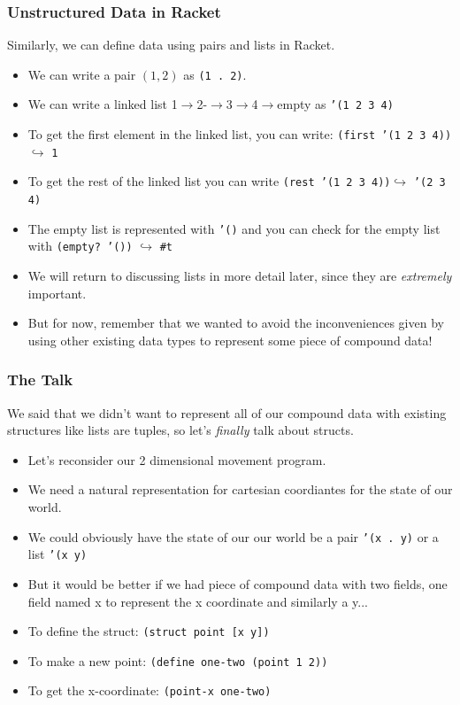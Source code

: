 \documentclass{beamer}
\begin{document}
\begin{frame}
  \frametitle{Unstructured Data in Racket}
  Similarly, we can define data using pairs and lists in Racket.
  \begin{itemize}
  \item<2-> We can write a pair $(1, 2)$ as \texttt{(1 . 2)}.
  \item<3-> We can write a linked list 1$\rightarrow$2-$\rightarrow$3$\rightarrow$4$\rightarrow$empty as \texttt{'(1 2 3 4)}
  \item<4-> To get the first element in the linked list, you can write:
    \texttt{(first '(1 2 3 4))}$\hookrightarrow$ \texttt{1}
  \item<5-> To get the rest of the linked list you can write
    \texttt{(rest '(1 2 3 4))}$\hookrightarrow$ \texttt{'(2 3 4)}
  \item<6-> The empty list is represented with \texttt{'()}
    and you can check for the empty list with \texttt{(empty? '())}
    $\hookrightarrow$ \texttt{\#t}
  \item<7-> We will return to discussing lists in more detail later,
    since they are \emph{extremely} important.
  \item<8-> But for now, remember that we wanted to avoid the inconveniences
    given by using other existing data types to represent some piece of compound data!
  \end{itemize}
\end{frame}

\begin{frame}
  \frametitle{The Talk}
  We said that we didn't want to represent all of our compound data with
  existing structures like lists are tuples, so
  let's \emph{finally} talk about structs.
  \begin{itemize}
  \item<2-> Let's reconsider our 2 dimensional movement program.
  \item<3-> We need a natural representation for cartesian coordiantes for the state of our world.
  \item<4-> We could obviously have the state of our our world be a pair
    \texttt{'(x . y)} or a list \texttt{'(x  y)}
  \item<5-> But it would be better if we had piece of compound data with two fields, one field named x to represent the x coordinate and similarly a y...
  \item<6-> To define the struct: \texttt{(struct point [x y])}
  \item<7-> To make a new point: \texttt{(define one-two (point 1 2))}
  \item<8-> To get the x-coordinate: \texttt{(point-x one-two)}
  \end{itemize}
\end{frame}
\end{document}
